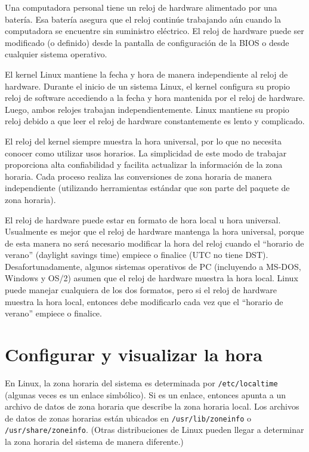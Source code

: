 \documentclass[12pt]{article}
\begin{document}
Una computadora personal tiene un reloj de hardware alimentado por una batería.
Esa batería asegura que el reloj continúe trabajando aún cuando la computadora se encuentre sin
suministro eléctrico. El reloj de hardware puede ser modificado (o definido)
desde la pantalla de configuración de la BIOS o desde cualquier sistema operativo.


El kernel Linux mantiene la fecha y hora de manera independiente al reloj de hardware.
Durante el inicio de un sistema Linux, el kernel configura su propio reloj de software accediendo
a la fecha y hora mantenida por el reloj de hardware.
Luego, ambos relojes trabajan independientemente.
Linux mantiene su propio reloj debido a que leer el reloj de hardware constantemente es lento y complicado.



El reloj del kernel siempre muestra la hora universal, por lo que
no necesita conocer como utilizar usos horarios. La simplicidad de este
modo de trabajar proporciona alta confiabilidad y facilita actualizar 
la información de la zona horaria. Cada proceso realiza las conversiones de zona horaria 
de manera independiente (utilizando herramientas estándar que son parte del paquete de zona horaria).



El reloj de hardware puede estar en formato de hora local u hora universal.
Usualmente es mejor que el reloj de hardware mantenga la hora universal,
porque de esta manera no será necesario modificar la hora del reloj cuando el ``horario de verano''
(daylight savings time) empiece o finalice (UTC no tiene DST). Desafortunadamente, algunos sistemas operativos de PC
(incluyendo a MS-DOS, Windows y OS/2) asumen que el reloj de hardware muestra la hora local.
Linux puede manejar cualquiera de los dos formatos, pero si el reloj de hardware muestra la hora local,
entonces debe modificarlo cada vez que el ``horario de verano'' empiece o finalice.


\section{
Configurar y visualizar la hora}


En Linux, la zona horaria del sistema es determinada por \texttt{/etc/localtime} (algunas veces
es un enlace simbólico). Si es un enlace, entonces apunta a un archivo de datos de zona horaria
que describe la zona horaria local. Los archivos de datos de zonas horarias están ubicados en
\texttt{/usr/lib/zoneinfo} o \texttt{/usr/share/zoneinfo}. (Otras distribuciones de Linux pueden llegar
a determinar la zona horaria del sistema de manera diferente.)
\end{document}
